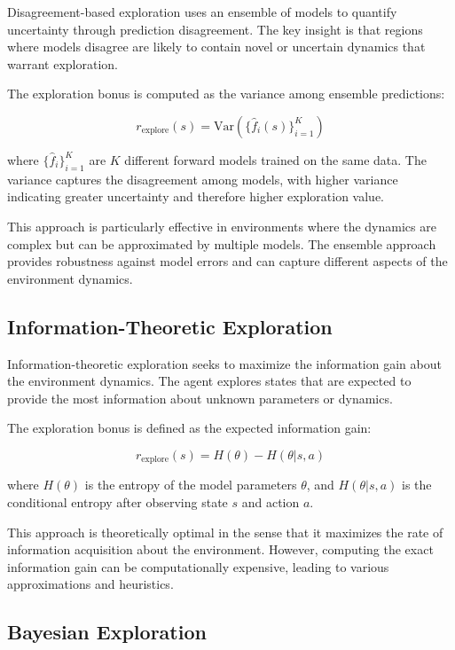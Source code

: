 \documentclass[12pt]{article}
\begin{document}
{{{Disagreement-based exploration uses an ensemble of models to quantify uncertainty through prediction disagreement. The key insight is that regions where models disagree are likely to contain novel or uncertain dynamics that warrant exploration.

The exploration bonus is computed as the variance among ensemble predictions:

\begin{equation}
r_{\text{explore}}(s) = \text{Var}(\{\hat{f}_i(s)\}_{i=1}^K)
\end{equation}

where $\{\hat{f}_i\}_{i=1}^K$ are $K$ different forward models trained on the same data. The variance captures the disagreement among models, with higher variance indicating greater uncertainty and therefore higher exploration value.

This approach is particularly effective in environments where the dynamics are complex but can be approximated by multiple models. The ensemble approach provides robustness against model errors and can capture different aspects of the environment dynamics.

\subsection{Information-Theoretic Exploration}

Information-theoretic exploration seeks to maximize the information gain about the environment dynamics. The agent explores states that are expected to provide the most information about unknown parameters or dynamics.

The exploration bonus is defined as the expected information gain:

\begin{equation}
r_{\text{explore}}(s) = H(\theta) - H(\theta | s, a)
\end{equation}

where $H(\theta)$ is the entropy of the model parameters $\theta$, and $H(\theta | s, a)$ is the conditional entropy after observing state $s$ and action $a$.

This approach is theoretically optimal in the sense that it maximizes the rate of information acquisition about the environment. However, computing the exact information gain can be computationally expensive, leading to various approximations and heuristics.

\subsection{Bayesian Exploration}

}}}
\end{document}
